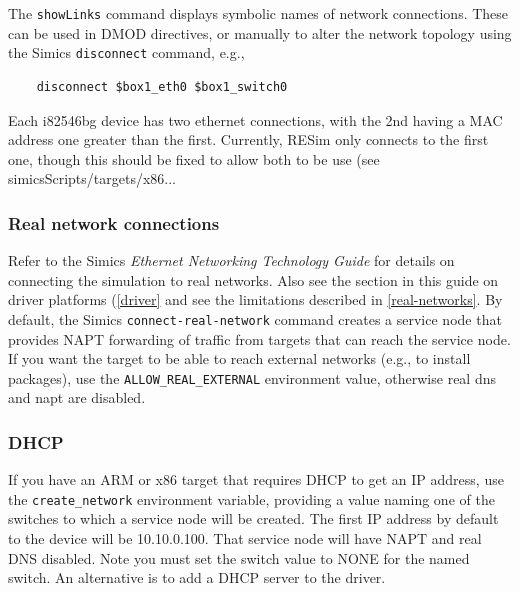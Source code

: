 \documentclass[titlepage]{article}
\begin{document}
The {\tt showLinks} command displays symbolic names of network connections.  These can be used in DMOD directives, or manually to alter
the network topology using the Simics {\tt disconnect} command, e.g., 
\begin{verbatim}
    disconnect $box1_eth0 $box1_switch0
\end{verbatim}

Each i82546bg device has two ethernet connections, with the 2nd having a MAC address one greater than the first.  Currently, RESim only connects to the first one,
though this should be fixed to allow both to be use (see simicsScripts/targets/x86...

\subsubsection{Real network connections}
Refer to the Simics \textit{Ethernet Networking Technology Guide} for details on connecting the simulation to real networks.
Also see the section in this guide on driver platforms (\ref{driver} and see the limitations described in \ref{real-networks}.  
By default, the Simics {\tt connect-real-network} command creates a service
node that provides NAPT forwarding of traffic from targets that can reach the service node.  If you want the target to be able to
reach external networks (e.g., to install packages), use the {\tt ALLOW\_REAL\_EXTERNAL} environment value, otherwise real dns and napt are disabled.

\subsubsection{DHCP}
\label{DHCP}
If you have an ARM or x86 target that requires DHCP to get an IP address, use the {\tt create\_network} environment variable, providing a value
naming one of the switches to which a service node will be created.  The first IP address by default to the device will be 10.10.0.100.
That service node will have NAPT and real DNS disabled.  Note you must set the switch value to NONE for the named switch.  An alternative is to add
a DHCP server to the driver.
\end{document}
